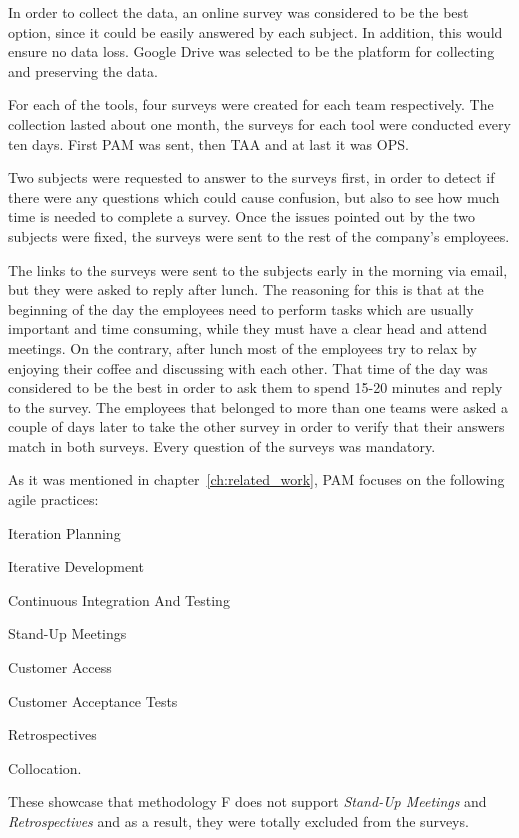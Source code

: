 
In order to collect the data, an online survey was considered to be the best option, since it could be easily answered by each subject. In addition, this would ensure no data loss. Google Drive \texttrademark \cite{google_drive} was selected to be the platform for collecting and preserving the data.

For each of the tools, four surveys were created for each team respectively. The collection lasted about one month, the surveys for each tool were conducted every ten days. First \ac{PAM} was sent, then \ac{TAA} and at last it was \ac{OPS}.

Two subjects were requested to answer to the surveys first, in order to detect if there were any questions which could cause confusion, but also to see how much time is needed to complete a survey. Once the issues pointed out by the two subjects were fixed, the surveys were sent to the rest of the company's employees.

The links to the surveys were sent to the subjects early in the morning via email, but they were asked to reply after lunch. The reasoning for this is that at the beginning of the day the employees need to perform tasks which are usually important and time consuming, while they must have a clear head and attend meetings. On the contrary, after lunch most of the employees try to relax by enjoying their coffee and discussing with each other. That time of the day was considered to be the best in order to ask them to spend 15-20 minutes and reply to the survey. The employees that belonged to more than one teams were asked a couple of days later to take the other survey in order to verify that their answers match in both surveys. Every question of the surveys was mandatory.

As it was mentioned in chapter~\ref{ch:related_work}, \ac{PAM} focuses on the following agile practices:
\begin{inparaenum} [a\upshape)]
	\item Iteration Planning
	\item Iterative Development
	\item Continuous Integration And Testing
	\item Stand-Up Meetings
	\item Customer Access
	\item Customer Acceptance Tests
	\item Retrospectives
	\item Collocation.
\end{inparaenum}
These showcase that methodology F does not support \textit{Stand-Up Meetings} and \textit{Retrospectives} and as a result, they were totally excluded from the surveys.

